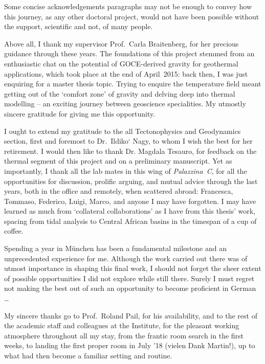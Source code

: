 \vspace{-1.65cm}
\begin{flushright}
\end{flushright}

\noindent Some concise acknowledgements paragraphs may not be enough to convey how this journey, as any other doctoral project, would not have been possible without the support, scientific and not, of many people.

Above all, I thank my supervisor Prof.~Carla Braitenberg, for her precious guidance through these years.
The foundations of this project stemmed from an enthusiastic chat on the potential of GOCE-derived gravity for geothermal applications, which took place at the end of April~2015: back then, I was just enquiring for a master thesis topic.
Trying to enquire the temperature field meant getting out of the `comfort zone' of gravity and delving deep into thermal modelling -- an exciting journey between geoscience specialities.
My utmostly sincere gratitude for giving me this opportunity.

I ought to extend my gratitude to the all Tectonophysics and Geodynamics section, first and foremost to Dr.~Ildiko‘ Nagy, to whom I wish the best for her retirement.
I would then like to thank Dr. Magdala Tesauro, for feedback on the thermal segment of this project and on a preliminary manuscript.
Yet as importantly, I thank all the lab mates in this wing of \textit{Palazzina~C}, for all the opportunities for discussion, prolific arguing, and mutual advice through the last years, both in the office and remotely, when scattered abroad: Francesca, Tommaso, Federico, Luigi, Marco, and anyone I may have forgotten.
I may have learned as much from `collateral collaborations' as I have from this thesis' work, spacing from tidal analysis to Central African basins in the timespan of a cup of coffee.

\bigskip

Spending a year in München has been a fundamental milestone and an unprecedented experience for me.
Although the work carried out there was of utmost importance in shaping this final work, I should not forget the sheer extent of possible opportunities I did not explore while still there.
Surely I must regret not making the best out of such an opportunity to become proficient in German \dots

My sincere thanks go to Prof.~Roland Pail, for his availability, and to the rest of the academic staff and colleagues at the Institute, for the pleasant working atmosphere throughout all my stay, from the frantic room search in the first weeks, to landing the first proper room in July ’18 (vielen Dank Martin!), up to what had then become a familiar setting and routine.

